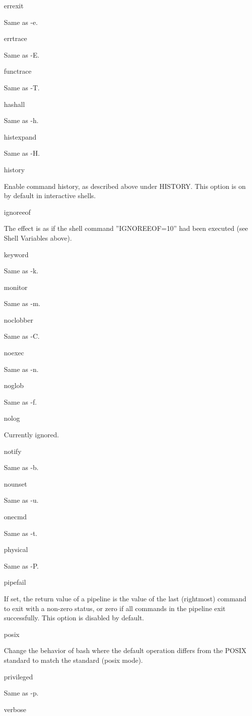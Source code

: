 {{{{{{errexit

Same as -e.

errtrace

Same as -E.

functrace

Same as -T.

hashall

Same as -h.

histexpand

Same as -H.

history

Enable command history, as described above under HISTORY. This option is on by default in interactive shells.

ignoreeof

The effect is as if the shell command ''IGNOREEOF=10'' had been executed (see Shell Variables above).

keyword

Same as -k.

monitor

Same as -m.

noclobber

Same as -C.

noexec

Same as -n.

noglob

Same as -f.

nolog

Currently ignored.

notify

Same as -b.

nounset

Same as -u.

onecmd

Same as -t.

physical

Same as -P.

pipefail

If set, the return value of a pipeline is the value of the last (rightmost) command to exit with a non-zero status, or zero if all commands in the pipeline exit successfully. This option is disabled by default.

posix

Change the behavior of bash where the default operation differs from the POSIX standard to match the standard (posix mode).

privileged

Same as -p.

verbose

}}}}}}
